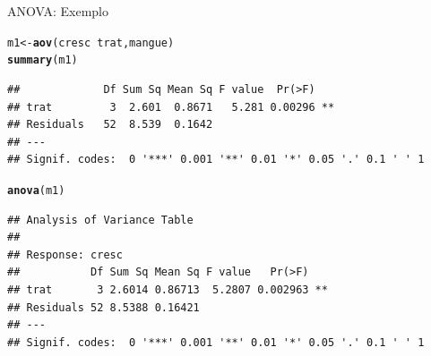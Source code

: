 \documentclass{beamer}\usepackage[]{graphicx}\usepackage[]{color}
\makeatletter
\newcommand{\hlopt}[1]{\textcolor[rgb]{0,0,0}{#1}}%
\newcommand{\hlstd}[1]{\textcolor[rgb]{0.345,0.345,0.345}{#1}}%
\newcommand{\hlkwb}[1]{\textcolor[rgb]{0.69,0.353,0.396}{#1}}%
\newcommand{\hlkwd}[1]{\textcolor[rgb]{0.737,0.353,0.396}{\textbf{#1}}}%
\newenvironment{kframe}{%
 \def\at@end@of@kframe{}%
 \ifinner\ifhmode%
  \def\at@end@of@kframe{\end{minipage}}%
  \begin{minipage}{\columnwidth}%
 \fi\fi%
 \def\FrameCommand##1{\hskip\@totalleftmargin \hskip-\fboxsep
 \colorbox{shadecolor}{##1}\hskip-\fboxsep
     \hskip-\linewidth \hskip-\@totalleftmargin \hskip\columnwidth}%
 \MakeFramed {\advance\hsize-\width
   \@totalleftmargin\z@ \linewidth\hsize
   \@setminipage}}%
 {\par\unskip\endMakeFramed%
 \at@end@of@kframe}
\newenvironment{knitrout}{}{} %
\renewenvironment{knitrout}{\setlength{\topsep}{0mm}}{}
\makeatother
\begin{document}
\begin{frame}[fragile]{ANOVA: Exemplo}

\begin{knitrout}\tiny
{}\color{fgcolor}\begin{kframe}
\begin{alltt}
\hlstd{m1} \hlkwb{<-} \hlkwd{aov}\hlstd{(cresc} \hlopt{~} \hlstd{trat,mangue)}
\hlkwd{summary}\hlstd{(m1)}
\end{alltt}
\begin{verbatim}
##             Df Sum Sq Mean Sq F value  Pr(>F)   
## trat         3  2.601  0.8671   5.281 0.00296 **
## Residuals   52  8.539  0.1642                   
## ---
## Signif. codes:  0 '***' 0.001 '**' 0.01 '*' 0.05 '.' 0.1 ' ' 1
\end{verbatim}
\begin{alltt}
\hlkwd{anova}\hlstd{(m1)}
\end{alltt}
\begin{verbatim}
## Analysis of Variance Table
## 
## Response: cresc
##           Df Sum Sq Mean Sq F value   Pr(>F)   
## trat       3 2.6014 0.86713  5.2807 0.002963 **
## Residuals 52 8.5388 0.16421                    
## ---
## Signif. codes:  0 '***' 0.001 '**' 0.01 '*' 0.05 '.' 0.1 ' ' 1
\end{verbatim}
\end{kframe}
\end{knitrout}

\end{frame}
\end{document}
